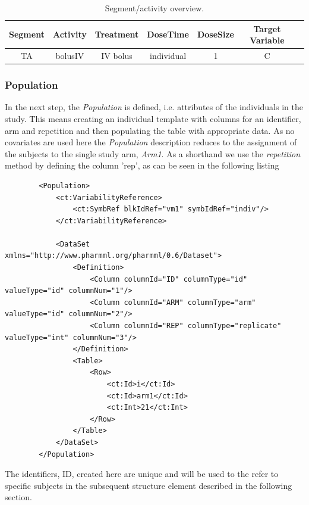 \begin{table}[htdp!]
\begin{center}
\begin{tabular}{ccccccc}
\hline
Segment&Activity & Treatment & DoseTime & DoseSize & Target Variable \\
\hline
TA& bolusIV &  IV bolus & individual & 1 & C \\
\hline
\end{tabular}
\end{center}
\caption{Segment/activity overview.}
\label{tab:segementActivity_Ribba}
\end{table}

\subsubsection{Population}
In the next step, the \textit{Population} is defined, i.e. attributes of the individuals in the study. 
This means creating an individual template with columns for an identifier, arm and repetition and then
populating the table with appropriate data.
As no covariates are used here the \textit{Population} description reduces to the assignment 
of the subjects to the single study arm, \textit{Arm1}. As a shorthand we use the
\textit{repetition} method by defining the column 'rep', as can be seen in the following listing 
\lstset{language=XML}
\begin{lstlisting}
        <Population> 
            <ct:VariabilityReference>
                <ct:SymbRef blkIdRef="vm1" symbIdRef="indiv"/>
            </ct:VariabilityReference>
            
            <DataSet xmlns="http://www.pharmml.org/pharmml/0.6/Dataset">
                <Definition>
                    <Column columnId="ID" columnType="id" valueType="id" columnNum="1"/> 
                    <Column columnId="ARM" columnType="arm" valueType="id" columnNum="2"/> 
                    <Column columnId="REP" columnType="replicate" valueType="int" columnNum="3"/> 
                </Definition>
                <Table>
                    <Row>
                        <ct:Id>i</ct:Id>
                        <ct:Id>arm1</ct:Id>
                        <ct:Int>21</ct:Int>
                    </Row>
                </Table>
            </DataSet>
        </Population>
\end{lstlisting}

The identifiers, ID, created here are unique and will be used to the refer to specific subjects 
in the subsequent  structure element described in the following section.



